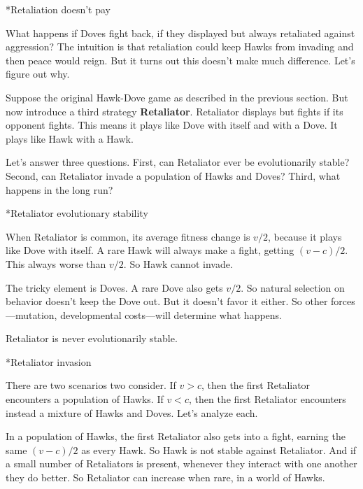 \documentclass[10pt,reqno]{amsbook}
\makeatletter
\newcommand{\bemph}[1]{{\textbf{\textcolor{bemphcol}{#1}}}}
\renewcommand\section{\@startsection{section}{1}
\z@{.7\linespacing\@plus\linespacing}{.5\linespacing}
{\large\bfseries\itshape}}
\renewcommand\subsection{\@startsection{subsection}{2}
\z@{.5\linespacing\@plus.7\linespacing}{-.5em}%
{\normalfont\normalsize\bfseries}}
\numberwithin{equation}{chapter}
\makeatother
\begin{document}
\section*{Retaliation doesn't pay}

What happens if Doves fight back, if they displayed but always retaliated against aggression? The intuition is that retaliation could keep Hawks from invading and then peace would reign. But it turns out this doesn't make much difference. Let's figure out why.

Suppose the original Hawk-Dove game as described in the previous section. But now introduce a third strategy \bemph{Retaliator}. Retaliator displays but fights if its opponent fights. This means it plays like Dove with itself and with a Dove. It plays like Hawk with a Hawk.

Let's answer three questions. First, can Retaliator ever be evolutionarily stable? Second, can Retaliator invade a population of Hawks and Doves? Third, what happens in the long run?

\subsection*{Retaliator evolutionary stability}

When Retaliator is common, its average fitness change is $v/2$, because it plays like Dove with itself. A rare Hawk will always make a fight, getting $(v-c)/2$. This always worse than $v/2$. So Hawk cannot invade.

The tricky element is Doves. A rare Dove also gets $v/2$. So natural selection on behavior doesn't keep the Dove out. But it doesn't favor it either. So other forces---mutation, developmental costs---will determine what happens.

Retaliator is never evolutionarily stable.

\subsection*{Retaliator invasion}

There are two scenarios two consider. If $v>c$, then the first Retaliator encounters a population of Hawks. If $v<c$, then the first Retaliator encounters instead a mixture of Hawks and Doves. Let's analyze each.

In a population of Hawks, the first Retaliator also gets into a fight, earning the same $(v-c)/2$ as every Hawk. So Hawk is not stable against Retaliator. And if a small number of Retaliators is present, whenever they interact with one another they do better. So Retaliator can increase when rare, in a world of Hawks.
\end{document}
